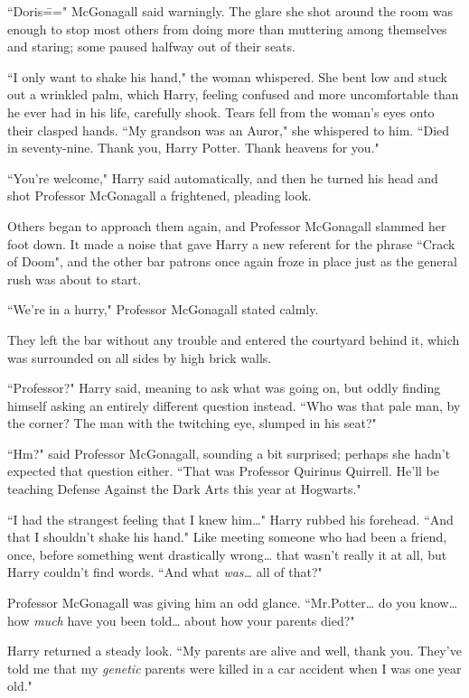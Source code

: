 ``Doris\===" McGonagall said warningly. The glare she shot around the room was enough to stop most others from doing more than muttering among themselves and staring; some paused halfway out of their seats.

``I only want to shake his hand," the woman whispered. She bent low and stuck out a wrinkled palm, which Harry, feeling confused and more uncomfortable than he ever had in his life, carefully shook. Tears fell from the woman's eyes onto their clasped hands. ``My grandson was an Auror," she whispered to him. ``Died in seventy-nine. Thank you, Harry Potter. Thank heavens for you."

``You're welcome," Harry said automatically, and then he turned his head and shot Professor McGonagall a frightened, pleading look.

Others began to approach them again, and Professor McGonagall slammed her foot down. It made a noise that gave Harry a new referent for the phrase ``Crack of Doom", and the other bar patrons once again froze in place just as the general rush was about to start.

``We're in a hurry," Professor McGonagall stated calmly.

They left the bar without any trouble and entered the courtyard behind it, which was surrounded on all sides by high brick walls.

``Professor?" Harry said, meaning to ask what was going on, but oddly finding himself asking an entirely different question instead. ``Who was that pale man, by the corner? The man with the twitching eye, slumped in his seat?"

``Hm?" said Professor McGonagall, sounding a bit surprised; perhaps she hadn't expected that question either. ``That was Professor Quirinus Quirrell. He'll be teaching Defense Against the Dark Arts this year at Hogwarts."

``I had the strangest feeling that I knew him{\ldots}" Harry rubbed his forehead. ``And that I shouldn't shake his hand." Like meeting someone who had been a friend, once, before something went drastically wrong{\ldots} that wasn't really it at all, but Harry couldn't find words. ``And what \emph{was{\ldots}} all of that?"

Professor McGonagall was giving him an odd glance. ``Mr.\?Potter{\ldots} do you know{\ldots} how \emph{much} have you been told{\ldots} about how your parents died?"

Harry returned a steady look. ``My parents are alive and well, thank you. They've told me that my \emph{genetic} parents were killed in a car accident when I was one year old."


